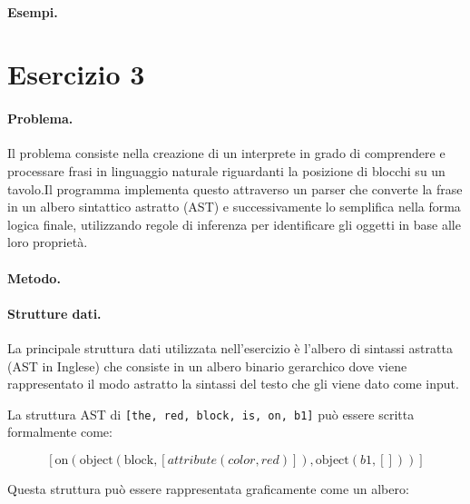 \documentclass[12pt,twoside]{report}
\begin{document}
\paragraph{Esempi.} 



\section*{Esercizio 3}

\paragraph{Problema.} Il problema consiste nella creazione di un interprete in grado di comprendere e processare frasi in linguaggio naturale riguardanti la posizione di blocchi su un tavolo.Il programma implementa questo attraverso un parser che converte la frase in un albero sintattico astratto (AST) e successivamente lo semplifica nella forma logica finale, utilizzando regole di inferenza per identificare gli oggetti in base alle loro proprietà.

\paragraph{Metodo.}

\paragraph{Strutture dati.} La principale struttura dati utilizzata nell'esercizio è l'albero di sintassi astratta (AST in Inglese) che consiste in un albero binario gerarchico dove viene rappresentato il modo astratto la sintassi del testo che gli viene dato come input.

La struttura AST di \texttt{[the, red, block, is, on, b1]} può essere scritta formalmente come:

\[
[\text{on}(\text{object}(\text{block},[attribute(color,red)]),\text{object}(b1,[]))]
\]

Questa struttura può essere rappresentata graficamente come un albero:
\end{document}
